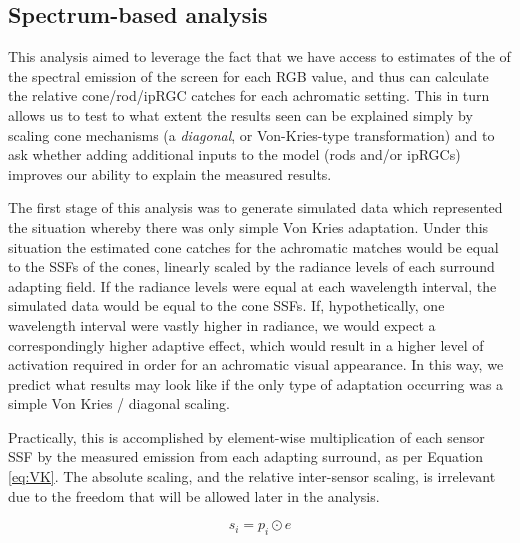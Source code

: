 

\subsection{Spectrum-based analysis}

This analysis aimed to leverage the fact that we have access to estimates of the of the spectral emission of the screen for each RGB value, and thus can calculate the relative cone/rod/\gls{ipRGC} catches for each achromatic setting. This in turn allows us to test to what extent the results seen can be explained simply by scaling cone mechanisms (a \emph{diagonal}, or Von-Kries-type transformation) and to ask whether adding additional inputs to the model (rods and/or \glspl{ipRGC}) improves our ability to explain the measured results.

The first stage of this analysis was to generate simulated data which represented the situation whereby there was only simple Von Kries adaptation. Under this situation the estimated cone catches for the achromatic matches would be equal to the \glspl{SSF} of the cones, linearly scaled by the radiance levels of each surround adapting field. If the radiance levels were equal at each wavelength interval, the simulated data would be equal to the cone \glspl{SSF}. If, hypothetically, one wavelength interval were vastly higher in radiance, we would expect a correspondingly higher adaptive effect, which would result in a higher level of activation required in order for an achromatic visual appearance. In this way, we predict what results may look like if the only type of adaptation occurring was a simple Von Kries / diagonal scaling. 

Practically, this is accomplished by element-wise multiplication of each sensor \gls{SSF} by the measured emission from each adapting surround, as per Equation \ref{eq:VK}. The absolute scaling, and the relative inter-sensor scaling, is irrelevant due to the freedom that will be allowed later in the analysis.

\begin{equation}
s_i = p_i \odot e
\label{eq:VK}
\end{equation}

